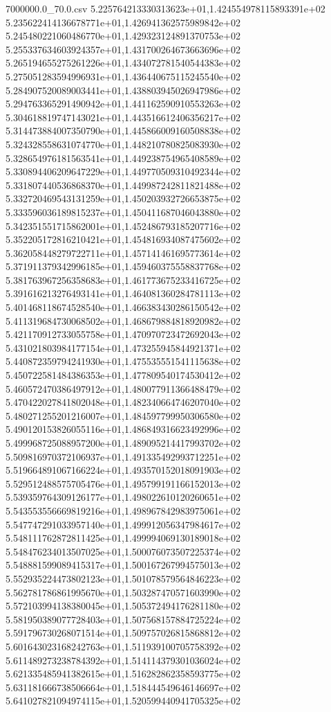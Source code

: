 \begin{filecontents*}{7000000.0_70.0.csv}
5.225764213330313623e+01,1.424554978115893391e+02
5.235622414136678771e+01,1.426941362575989842e+02
5.245480221060486770e+01,1.429323124891370753e+02
5.255337634603924357e+01,1.431700264673663696e+02
5.265194655275261226e+01,1.434072781540544383e+02
5.275051283594996931e+01,1.436440675115245540e+02
5.284907520089003441e+01,1.438803945026947986e+02
5.294763365291490942e+01,1.441162590910553263e+02
5.304618819747143021e+01,1.443516612406356217e+02
5.314473884007350790e+01,1.445866009160508838e+02
5.324328558631074770e+01,1.448210780825083930e+02
5.328654976181563541e+01,1.449238754965408589e+02
5.330894406209647229e+01,1.449770509310492344e+02
5.331807440536868370e+01,1.449987242811821488e+02
5.332720469543131259e+01,1.450203932726653875e+02
5.333596036189815237e+01,1.450411687046043880e+02
5.342351551715862001e+01,1.452486793185207716e+02
5.352205172816210421e+01,1.454816934087475602e+02
5.362058448279722711e+01,1.457141461695773614e+02
5.371911379342996185e+01,1.459460375558837768e+02
5.381763967256358683e+01,1.461773675233416725e+02
5.391616213276493141e+01,1.464081360284781113e+02
5.401468118674528540e+01,1.466383430286150542e+02
5.411319684730068502e+01,1.468679884818920982e+02
5.421170912733055758e+01,1.470970723472692043e+02
5.431021803984177154e+01,1.473255945844921371e+02
5.440872359794241930e+01,1.475535551541115638e+02
5.450722581484386353e+01,1.477809540174530412e+02
5.460572470386497912e+01,1.480077911366488479e+02
5.470422027841802048e+01,1.482340664746207040e+02
5.480271255201216007e+01,1.484597799950306580e+02
5.490120153826055116e+01,1.486849316623492996e+02
5.499968725088957200e+01,1.489095214417993702e+02
5.509816970372106937e+01,1.491335492993712251e+02
5.519664891067166224e+01,1.493570152018091903e+02
5.529512488575705476e+01,1.495799191166152013e+02
5.539359764309126177e+01,1.498022610120260651e+02
5.543553556669819216e+01,1.498967842983975061e+02
5.547747291033957140e+01,1.499912056347984617e+02
5.548111762872811425e+01,1.499994069130189018e+02
5.548476234013507025e+01,1.500076073507225374e+02
5.548881599089415317e+01,1.500167267994575013e+02
5.552935224473802123e+01,1.501078579564846223e+02
5.562781786861995670e+01,1.503287470571603990e+02
5.572103994138380045e+01,1.505372494176281180e+02
5.581950389077728403e+01,1.507568157884725224e+02
5.591796730268071514e+01,1.509757026815868812e+02
5.601643023168242763e+01,1.511939100705758392e+02
5.611489273238784392e+01,1.514114379301036024e+02
5.621335485941382615e+01,1.516282862358593775e+02
5.631181666738506664e+01,1.518444549646146697e+02
5.641027821094974115e+01,1.520599440941705325e+02

\end{filecontents*}
